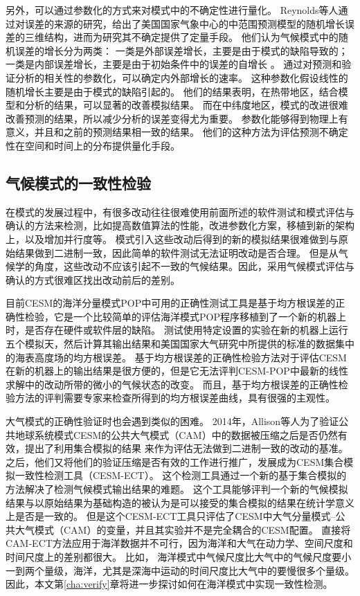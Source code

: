 另外，可以通过参数化的方式来对模式中的不确定性进行量化。
Reynolds等人\cite{reynolds1994random}通过对误差的来源的研究，给出了美国国家气象中心的中范围预测模型的随机增长误差的三维结构，进而为研究其不确定提供了定量手段。
他们认为气候模式中的随机误差的增长分为两类： 一类是外部误差增长，主要是由于模式的缺陷导致的；一类是内部误差增长，主要是由于初始条件中的误差的自增长 。 
通过对预测和验证分析的相关性的参数化，可以确定内外部增长的速率。
这种参数化假设线性的随机增长主要是由于模式的缺陷引起的。 
他们的结果表明，在热带地区，结合模型和分析的结果，可以显著的改善模拟结果。
而在中纬度地区，模式的改进很难改善预测的结果，所以减少分析的误差变得尤为重要。 
参数化能够得到物理上有意义，并且和之前的预测结果相一致的结果。
他们的这种方法为评估预测不确定性在空间和时间上的分布提供量化手段。


\subsection{气候模式的一致性检验}
\label{related:ECT}

在模式的发展过程中，有很多改动往往很难使用前面所述的软件测试和模式评估与确认的方法来检测，比如提高数值算法的性能，改进参数化方案，移植到新的架构上，以及增加并行度等。
模式引入这些改动后得到的新的模拟结果很难做到与原始结果做到二进制一致，因此简单的软件测试无法证明改动是否合理。
但是从气候学的角度，这些改动不应该引起不一致的气候结果。因此，采用气候模式评估与确认的方式很难区找出改动前后的差别\cite{yong2015}。


目前CESM的海洋分量模式POP中可用的正确性测试工具是基于均方根误差的正确性检验，它是一个比较简单的评估海洋模式POP程序移植到了一个新的机器上时，是否存在硬件或软件层的缺陷\cite{vertenstein2011cesm1}。 
测试使用特定设置的实验在新的机器上运行五个模拟天，然后计算其输出结果和美国国家大气研究中所提供的标准的数据集中的海表高度场的均方根误差。 
基于均方根误差的正确性检验方法对于评估CESM在新的机器上的输出结果是很方便的，但是它无法评判CESM-POP中最新的线性求解中的改动所带的微小的气候状态的改变\cite{yong2015}。
而且，基于均方根误差的正确性检验方法的评判需要专家来检查所得到的均方根误差曲线，具有很强的主观性。

大气模式的正确性验证时也会遇到类似的困难。
2014年，Allison等人\cite{baker2014methodology}为了验证公共地球系统模式CESM的公共大气模式（CAM）中的数据被压缩之后是否仍然有效，提出了利用集合模拟的结果 来作为评估无法做到二进制一致的改动的基准。
之后，他们又将他们的验证压缩是否有效的工作进行推广，发展成为CESM集合模拟一致性检测工具（CESM-ECT）\cite{baker2015}。
这个检测工具通过一个新的基于集合模拟的方法解决了检测气候模式输出结果的难题。 
这个工具能够评判一个新的气候模拟结果与以原始结果为基础构造的被认为是可以接受的集合模拟的结果在统计学意义上是否是一致的。 
但是这个CESM-ECT工具只评估了CESM中大气分量模式--公共大气模式（CAM）的变量，并且其实验并不是完全耦合的CESM配置。
直接将CAM-ECT方法应用于海洋数据并不可行，因为海洋和大气在动力学、空间尺度和时间尺度上的差别都很大。
比如， 海洋模式中气候尺度比大气中的气候尺度要小一到两个量级，海洋，尤其是深海中运动的时间尺度比大气中的要慢很多个量级。
因此，本文第\ref{cha:verify}章将进一步探讨如何在海洋模式中实现一致性检测。 


